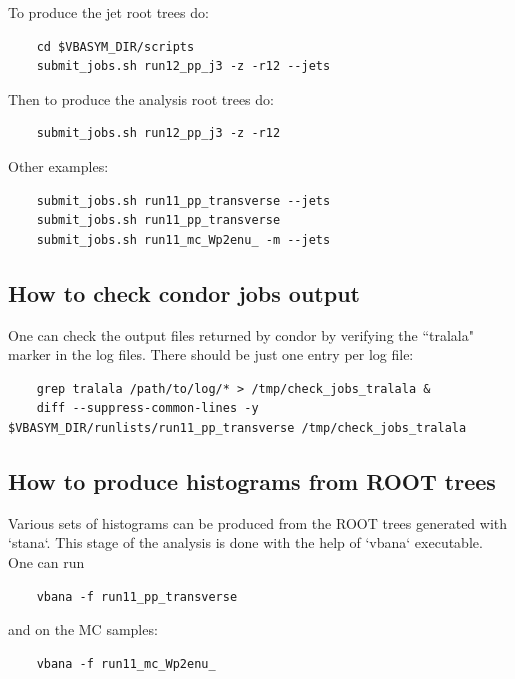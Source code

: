 \documentclass[12pt]{article}
\begin{document}
To produce the jet root trees do:

\begin{lstlisting}
    cd $VBASYM_DIR/scripts
    submit_jobs.sh run12_pp_j3 -z -r12 --jets
\end{lstlisting}

Then to produce the analysis root trees do:

\begin{lstlisting}
    submit_jobs.sh run12_pp_j3 -z -r12
\end{lstlisting}

Other examples:

\begin{lstlisting}
    submit_jobs.sh run11_pp_transverse --jets
    submit_jobs.sh run11_pp_transverse
    submit_jobs.sh run11_mc_Wp2enu_ -m --jets
\end{lstlisting}

\subsection{How to check condor jobs output}

One can check the output files returned by condor by verifying the ``tralala"
marker in the log files. There should be just one entry per log file:

\begin{lstlisting}
    grep tralala /path/to/log/* > /tmp/check_jobs_tralala &
    diff --suppress-common-lines -y $VBASYM_DIR/runlists/run11_pp_transverse /tmp/check_jobs_tralala
\end{lstlisting}

\subsection{How to produce histograms from ROOT trees}

Various sets of histograms can be produced from the ROOT trees generated with
`stana`. This stage of the analysis is done with the help of `vbana` executable.
One can run

\begin{lstlisting}
    vbana -f run11_pp_transverse
\end{lstlisting}

and on the MC samples:

\begin{lstlisting}
    vbana -f run11_mc_Wp2enu_
\end{lstlisting}
\end{document}
